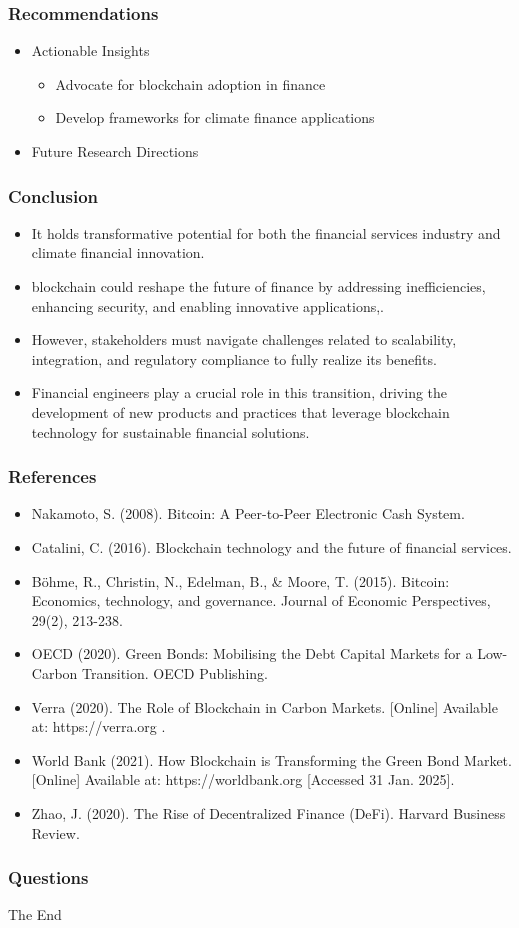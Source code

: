 \documentclass{beamer}
\begin{document}
\begin{frame}
    \frametitle{Recommendations}
    \begin{itemize}
        \item Actionable Insights
        \begin{itemize}
            \item Advocate for blockchain adoption in finance
            \item Develop frameworks for climate finance applications
        \end{itemize}
        \item Future Research Directions
    \end{itemize}
\end{frame}
\begin{frame}
    \frametitle{Conclusion}
    \begin{itemize}
        \item It holds transformative potential for both the financial services industry and climate financial innovation. 
        \item blockchain could reshape the future of finance by addressing inefficiencies, enhancing security, and enabling innovative applications,. \item However, stakeholders must navigate challenges related to scalability, integration, and regulatory compliance to fully realize its benefits. \item Financial engineers play a crucial role in this transition, driving the development of new products and practices that leverage blockchain technology for sustainable financial solutions.
    \end{itemize}
\end{frame}

\begin{frame}
    \frametitle{References}
    \begin{itemize}
        \item Nakamoto, S. (2008). Bitcoin: A Peer-to-Peer Electronic Cash System.
        \item Catalini, C. (2016). Blockchain technology and the future of financial services.
        \item Böhme, R., Christin, N., Edelman, B., & Moore, T. (2015). Bitcoin: Economics, technology, and governance. Journal of Economic Perspectives, 29(2), 213-238.
        \item OECD (2020). Green Bonds: Mobilising the Debt Capital Markets for a Low-Carbon Transition. OECD Publishing.
        \item Verra (2020). The Role of Blockchain in Carbon Markets. [Online] Available at: https://verra.org .
        \item World Bank (2021). How Blockchain is Transforming the Green Bond Market. [Online] Available at: https://worldbank.org [Accessed 31 Jan. 2025].
        \item Zhao, J. (2020). The Rise of Decentralized Finance (DeFi). Harvard Business Review.
    \end{itemize}
\end{frame}

\begin{frame}
    \frametitle{Questions}
    \centering
    \Huge{The End}

\end{frame}
\end{document}
